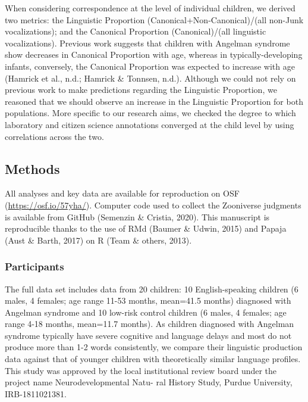 \documentclass[english,,man]{apa6}
\begin{document}
When considering correspondence at the level of individual children, we derived two metrics: the Linguistic Proportion (Canonical+Non-Canonical)/(all non-Junk vocalizations); and the Canonical Proportion (Canonical)/(all linguistic vocalizations). Previous work suggests that children with Angelman syndrome show decreases in Canonical Proportion with age, whereas in typically-developing infants, conversely, the Canonical Proportion was expected to increase with age (Hamrick et al., n.d.; Hamrick \& Tonnsen, n.d.). Although we could not rely on previous work to make predictions regarding the Linguistic Proportion, we reasoned that we should observe an increase in the Linguistic Proportion for both populations. More specific to our research aims, we checked the degree to which laboratory and citizen science annotations converged at the child level by using correlations across the two.

\hypertarget{methods}{%
\subsection{Methods}\label{methods}}

All analyses and key data are available for reproduction on OSF (\url{https://osf.io/57yha/}). Computer code used to collect the Zooniverse judgments is available from GitHub (Semenzin \& Cristia, 2020). This manuscript is reproducible thanks to the use of RMd (Baumer \& Udwin, 2015) and Papaja (Aust \& Barth, 2017) on R (Team \& others, 2013).

\hypertarget{participants}{%
\subsubsection{Participants}\label{participants}}

The full data set includes data from 20 children: 10 English-speaking children (6 males, 4 females; age range 11-53 months, mean=41.5 months) diagnosed with Angelman syndrome and 10 low-risk control children (6 males, 4 females; age range 4-18 months, mean=11.7 months). As children diagnosed with Angelman syndrome typically have severe cognitive and language delays and most do not produce more than 1-2 words consistently, we compare their linguistic production data against that of younger children with theoretically similar language profiles. This study was approved by the local institutional review board under the project name Neurodevelopmental Natu- ral History Study, Purdue University, IRB-1811021381.
\end{document}

